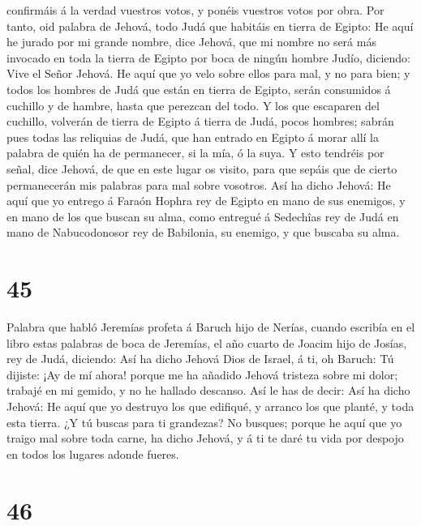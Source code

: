 confirmáis á la verdad vuestros votos, y ponéis vuestros votos por obra.
 Por tanto, oid palabra de Jehová, todo Judá que habitáis
en tierra de Egipto: He aquí he jurado por mi grande nombre, dice
Jehová, que mi nombre no será más invocado en toda la tierra de Egipto
por boca de ningún hombre Judío, diciendo: Vive el Señor Jehová.
 He aquí que yo velo sobre ellos para mal, y no para bien;
y todos los hombres de Judá que están en tierra de Egipto, serán
consumidos á cuchillo y de hambre, hasta que perezcan del todo.
 Y los que escaparen del cuchillo, volverán de tierra de
Egipto á tierra de Judá, pocos hombres; sabrán pues todas las reliquias
de Judá, que han entrado en Egipto á morar allí la palabra de quién ha
de permanecer, si la mía, ó la suya.  Y esto tendréis por
señal, dice Jehová, de que en este lugar os visito, para que sepáis que
de cierto permanecerán mis palabras para mal sobre vosotros.
 Así ha dicho Jehová: He aquí que yo entrego á Faraón
Hophra rey de Egipto en mano de sus enemigos, y en mano de los que
buscan su alma, como entregué á Sedechîas rey de Judá en mano de
Nabucodonosor rey de Babilonia, su enemigo, y que buscaba su alma.

\hypertarget{section-44}{%
\section{45}\label{section-44}}

 Palabra que habló Jeremías profeta á Baruch hijo de Nerías,
cuando escribía en el libro estas palabras de boca de Jeremías, el año
cuarto de Joacim hijo de Josías, rey de Judá, diciendo:  Así
ha dicho Jehová Dios de Israel, á ti, oh Baruch:  Tú
dijiste: ¡Ay de mí ahora! porque me ha añadido Jehová tristeza sobre mi
dolor; trabajé en mi gemido, y no he hallado descanso.  Así
le has de decir: Así ha dicho Jehová: He aquí que yo destruyo los que
edifiqué, y arranco los que planté, y toda esta tierra.  ¿Y
tú buscas para ti grandezas? No busques; porque he aquí que yo traigo
mal sobre toda carne, ha dicho Jehová, y á ti te daré tu vida por
despojo en todos los lugares adonde fueres.

\hypertarget{section-45}{%
\section{46}\label{section-45}}

